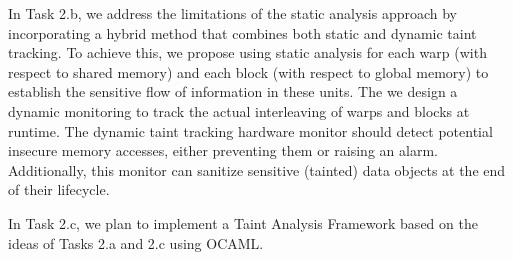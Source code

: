 In Task 2.b, we address the limitations of the static analysis approach by incorporating a hybrid method that combines both static and dynamic taint tracking.
% 
%
To achieve this, we propose using static analysis for each warp (with respect to shared memory) and each block (with respect to global memory) to establish the sensitive flow of information in these units.
%
The we design a dynamic monitoring to track the actual interleaving of warps and blocks at runtime.
% 
The dynamic taint tracking hardware monitor should detect potential insecure memory accesses, either preventing them or raising an alarm.
% 
Additionally, this monitor can sanitize sensitive (tainted) data objects at the end of their lifecycle.

%

In Task 2.c, we plan to implement a Taint Analysis Framework based on the ideas of Tasks 2.a and 2.c using OCAML.

